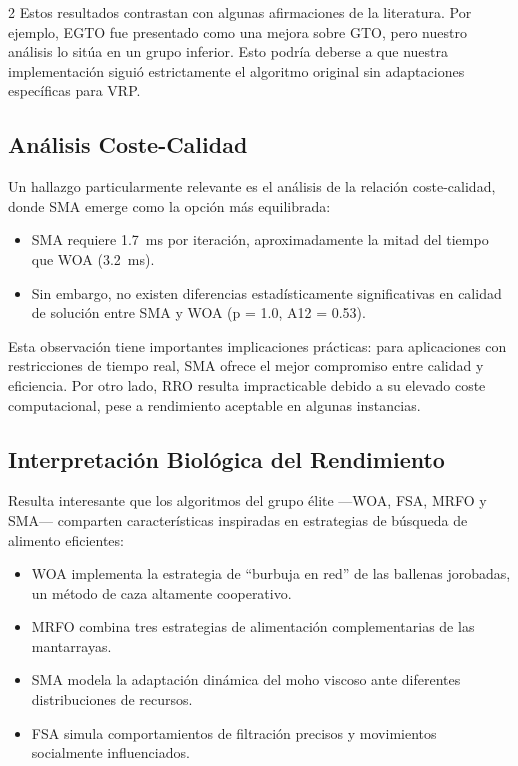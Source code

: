 \documentclass[10pt,a4paper]{extarticle}
\begin{document}
\begin{multicols}{2}
Estos resultados contrastan con algunas afirmaciones de la literatura. Por ejemplo, EGTO fue presentado como una mejora sobre GTO, pero nuestro análisis lo sitúa en un grupo inferior. Esto podría deberse a que nuestra implementación siguió estrictamente el algoritmo original sin adaptaciones específicas para VRP.

\subsection{Análisis Coste-Calidad}
Un hallazgo particularmente relevante es el análisis de la relación coste-calidad, donde SMA emerge como la opción más equilibrada:
\begin{itemize}
\item SMA requiere \SI{1.7}{\milli\second} por iteración, aproximadamente la mitad del tiempo que WOA (\SI{3.2}{\milli\second}).
\item Sin embargo, no existen diferencias estadísticamente significativas en calidad de solución entre SMA y WOA (p = 1.0, A12 = 0.53).
\end{itemize}

Esta observación tiene importantes implicaciones prácticas: para aplicaciones con restricciones de tiempo real, SMA ofrece el mejor compromiso entre calidad y eficiencia. Por otro lado, RRO resulta impracticable debido a su elevado coste computacional, pese a rendimiento aceptable en algunas instancias.

\subsection{Interpretación Biológica del Rendimiento}
Resulta interesante que los algoritmos del grupo élite —WOA, FSA, MRFO y SMA— comparten características inspiradas en estrategias de búsqueda de alimento eficientes:
\begin{itemize}
\item WOA implementa la estrategia de ``burbuja en red'' de las ballenas jorobadas, un método de caza altamente cooperativo.
\item MRFO combina tres estrategias de alimentación complementarias de las mantarrayas.
\item SMA modela la adaptación dinámica del moho viscoso ante diferentes distribuciones de recursos.
\item FSA simula comportamientos de filtración precisos y movimientos socialmente influenciados.
\end{itemize}


\end{multicols}
\end{document}

